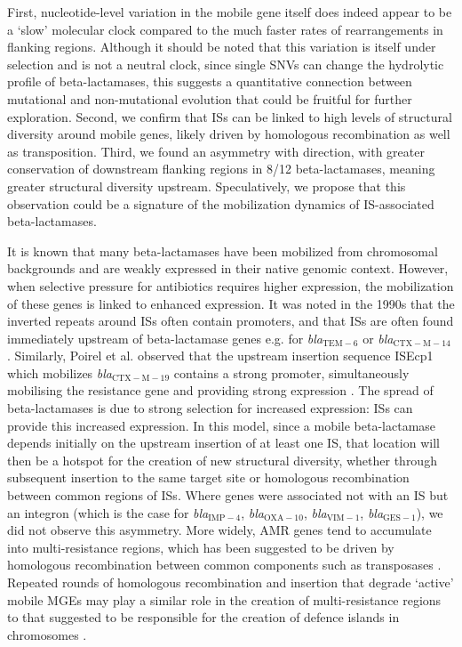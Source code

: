 \documentclass[rmp,superscriptaddress,11pt]{revtex4-1}
\newcommand{\bla}[1]{\textit{bla}$_\mathrm{#1}$}
\begin{document}
First, nucleotide-level variation in the mobile gene itself does indeed appear to be a `slow' molecular clock compared to the much faster rates of rearrangements in flanking regions. Although it should be noted that this variation is itself under selection and is not a neutral clock, since single SNVs can change the hydrolytic profile of beta-lactamases, this suggests a quantitative connection between mutational and non-mutational evolution that could be fruitful for further exploration. Second, we confirm that ISs can be linked to high levels of structural diversity around mobile genes, likely driven by homologous recombination as well as transposition. Third, we found an asymmetry with direction, with greater conservation of downstream flanking regions in 8/12 beta-lactamases, meaning greater structural diversity upstream. Speculatively, we propose that this observation could be a signature of the mobilization dynamics of IS-associated beta-lactamases.\par 

It is known that many beta-lactamases have been mobilized from chromosomal backgrounds and are weakly expressed in their native genomic context. However, when selective pressure for antibiotics requires higher expression, the mobilization of these genes is linked to enhanced expression. It was noted in the 1990s that the inverted repeats around ISs often contain promoters, and that ISs are often found immediately upstream of beta-lactamase genes e.g. for \bla{TEM-6} \cite{Goussard1991} or \bla{CTX-M-14} \cite{Cao2002}. Similarly, Poirel et al. observed that the upstream insertion sequence ISEcp1 which mobilizes \bla{CTX-M-19} contains a strong promoter, simultaneously mobilising the resistance gene and providing strong expression \cite{Poirel2003}. The spread of beta-lactamases is due to strong selection for increased expression: ISs can provide this increased expression. In this model, since a mobile beta-lactamase depends initially on the upstream insertion of at least one IS, that location will then be a hotspot for the creation of new structural diversity, whether through subsequent insertion to the same target site or homologous recombination between common regions of ISs. Where genes were associated not with an IS but an integron (which is the case for \bla{IMP-4}, \bla{OXA-10}, \bla{VIM-1}, \bla{GES-1}), we did not observe this asymmetry. More widely, AMR genes tend to accumulate into multi-resistance regions, which has been suggested to be driven by homologous recombination between common components such as transposases \cite{Partridge2011b}. Repeated rounds of homologous recombination and insertion that degrade `active' mobile MGEs may play a similar role in the creation of multi-resistance regions to that suggested to be responsible for the creation of defence islands in chromosomes \cite{Rocha2022}.  
\end{document}
